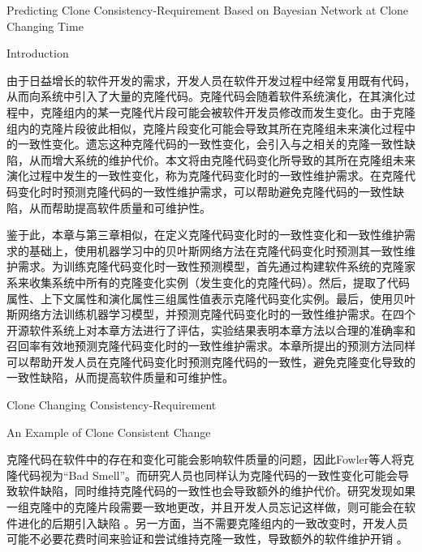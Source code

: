 
{Predicting Clone Consistency-Requirement Based on Bayesian Network at Clone Changing Time}

{Introduction}

由于日益增长的软件开发的需求，开发人员在软件开发过程中经常复用既有代码，从而向系统中引入了大量的克隆代码。克隆代码会随着软件系统演化，在其演化过程中，克隆组内的某一克隆代片段可能会被软件开发员修改而发生变化。由于克隆组内的克隆片段彼此相似，克隆片段变化可能会导致其所在克隆组未来演化过程中的一致性变化。遗忘这种克隆代码的一致性变化，会引入与之相关的克隆一致性缺陷，从而增大系统的维护代价。本文将由克隆代码变化所导致的其所在克隆组未来演化过程中发生的一致性变化，称为克隆代码变化时的一致性维护需求。在克隆代码变化时时预测克隆代码的一致性维护需求，可以帮助避免克隆代码的一致性缺陷，从而帮助提高软件质量和可维护性。

鉴于此，本章与第三章相似，在定义克隆代码变化时的一致性变化和一致性维护需求的基础上，使用机器学习中的贝叶斯网络方法在克隆代码变化时预测其一致性维护需求。为训练克隆代码变化时一致性预测模型，首先通过构建软件系统的克隆家系来收集系统中所有的克隆变化实例（发生变化的克隆代码）。然后，提取了代码属性、上下文属性和演化属性三组属性值表示克隆代码变化实例。最后，使用贝叶斯网络方法训练机器学习模型，并预测克隆代码变化时的一致性维护需求。在四个开源软件系统上对本章方法进行了评估，实验结果表明本章方法以合理的准确率和召回率有效地预测克隆代码变化时的一致性维护需求。本章所提出的预测方法同样可以帮助开发人员在克隆代码变化时预测克隆代码的一致性，避免克隆变化导致的一致性缺陷，从而提高软件质量和可维护性。

{Clone Changing Consistency-Requirement}

{An Example of Clone Consistent Change }

克隆代码在软件中的存在和变化可能会影响软件质量的问题，因此Fowler等人将克隆代码视为“Bad Smell”\cite{fowler2009refactoring}。而研究人员也同样认为克隆代码的一致性变化可能会导致软件缺陷，同时维持克隆代码的一致性也会导致额外的维护代价。研究发现如果一组克隆中的克隆片段需要一致地更改，并且开发人员忘记这样做，则可能会在软件进化的后期引入缺陷\cite{bettenburg2009empirical} \cite {juergens2009code}。另一方面，当不需要克隆组内的一致改变时，开发人员可能不必要花费时间来验证和尝试维持克隆一致性，导致额外的软件维护开销\cite{aversano2007clones} \cite{barbour2011late}。


